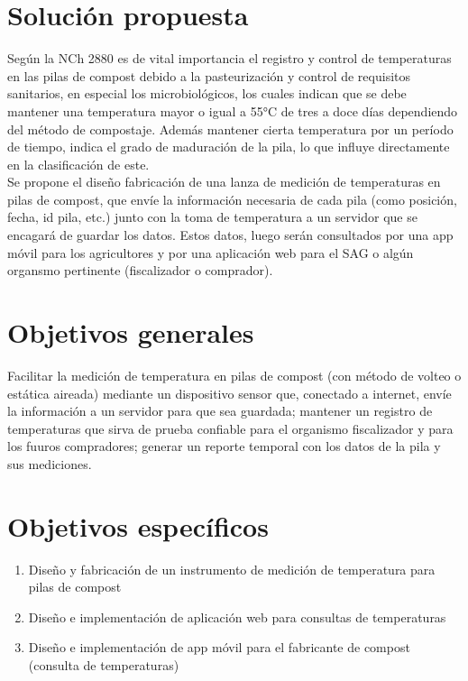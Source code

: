 \documentclass[12pt, letterpaper]{article}
\begin{document}
\section{Solución propuesta}
Según la NCh 2880 es de vital importancia el registro y control de temperaturas en las pilas de compost debido a la pasteurización y control de requisitos sanitarios, en especial los microbiológicos, los cuales indican que se debe mantener una temperatura mayor o igual a 55°C de tres a doce días dependiendo del método de compostaje. Además mantener cierta temperatura por un período de tiempo, indica el grado de maduración de la pila, lo que influye directamente en la clasificación de este. \\
Se propone el diseño  fabricación de una lanza de medición de temperaturas en pilas de compost, que envíe la información necesaria de cada pila (como posición, fecha, id pila, etc.) junto con la toma de temperatura a un servidor que se encagará de guardar los datos. Estos datos, luego serán consultados por una app móvil para los agricultores y por una aplicación web para el SAG o algún organsmo pertinente (fiscalizador o comprador).

\section{Objetivos generales}
Facilitar la medición de temperatura en pilas de compost (con método de volteo o estática aireada) mediante un dispositivo sensor que, conectado a internet, envíe la información a un servidor para que sea guardada; mantener un registro de temperaturas que sirva de prueba confiable
para el organismo fiscalizador y para los fuuros compradores; generar un reporte temporal con los datos de la pila y sus mediciones.

\section{Objetivos específicos}
\begin{enumerate}
	\item Diseño y fabricación de un instrumento de medición de temperatura para pilas de compost 
	\item Diseño e implementación de aplicación web para consultas de temperaturas
	\item Diseño e implementación de app móvil para el fabricante de compost (consulta de temperaturas)
\end{enumerate}
\end{document}

